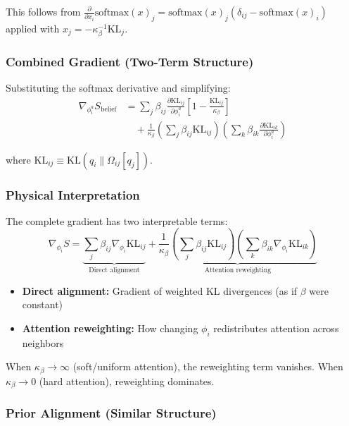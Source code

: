 \documentclass[11pt]{article}
\begin{document}
This follows from $\frac{\partial}{\partial x_i}\mathrm{softmax}(x)_j = \mathrm{softmax}(x)_j(\delta_{ij} - \mathrm{softmax}(x)_i)$ applied with $x_j = -\kappa_\beta^{-1}\mathrm{KL}_j$.

\subsubsection*{Combined Gradient (Two-Term Structure)}

Substituting the softmax derivative and simplifying:
\begin{align}
\nabla_{\phi_i^a} S_{\mathrm{belief}} &= \sum_j \beta_{ij}\frac{\partial \mathrm{KL}_{ij}}{\partial \phi_i^a}\left[1 - \frac{\mathrm{KL}_{ij}}{\kappa_\beta}\right] \nonumber \\
&\quad + \frac{1}{\kappa_\beta}\left(\sum_j \beta_{ij}\mathrm{KL}_{ij}\right)\left(\sum_k \beta_{ik}\frac{\partial \mathrm{KL}_{ik}}{\partial \phi_i^a}\right)
\end{align}

where $\mathrm{KL}_{ij} \equiv \mathrm{KL}(q_i \| \Omega_{ij}[q_j])$.

\subsubsection*{Physical Interpretation}

The complete gradient has two interpretable terms:
\begin{equation}
\boxed{\nabla_{\phi_i} S = \underbrace{\sum_j \beta_{ij}\nabla_{\phi_i}\mathrm{KL}_{ij}}_{\text{Direct alignment}} + \underbrace{\frac{1}{\kappa_\beta}\left(\sum_j \beta_{ij}\mathrm{KL}_{ij}\right) \left(\sum_k \beta_{ik}\nabla_{\phi_i}\mathrm{KL}_{ik}\right)}_{\text{Attention reweighting}}}
\end{equation}

\begin{itemize}
\item \textbf{Direct alignment:} Gradient of weighted KL divergences (as if $\beta$ were constant)
\item \textbf{Attention reweighting:} How changing $\phi_i$ redistributes attention across neighbors
\end{itemize}

When $\kappa_\beta \to \infty$ (soft/uniform attention), the reweighting term vanishes. When $\kappa_\beta \to 0$ (hard attention), reweighting dominates.

\subsubsection*{Prior Alignment (Similar Structure)}
\end{document}
